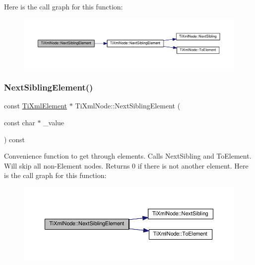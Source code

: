 Here is the call graph for this function\+:
\nopagebreak
\begin{figure}[H]
\begin{center}
\leavevmode
\includegraphics[width=350pt]{class_ti_xml_node_a1b211cb5034655a04358e0e2f6fc5010_cgraph}
\end{center}
\end{figure}
\mbox{\label{class_ti_xml_node_a22def4746238abaee042f99b47ef3c94}} 
\subsubsection{\texorpdfstring{Next\+Sibling\+Element()}{NextSiblingElement()}\hspace{0.1cm}{\footnotesize\ttfamily [3/4]}}
{\footnotesize\ttfamily const \hyperlink{class_ti_xml_element}{Ti\+Xml\+Element} $\ast$ Ti\+Xml\+Node\+::\+Next\+Sibling\+Element (\begin{DoxyParamCaption}\item[{const char $\ast$}]{\+\_\+value }\end{DoxyParamCaption}) const}

Convenience function to get through elements. Calls Next\+Sibling and To\+Element. Will skip all non-\/\+Element nodes. Returns 0 if there is not another element. Here is the call graph for this function\+:
\nopagebreak
\begin{figure}[H]
\begin{center}
\leavevmode
\includegraphics[width=350pt]{class_ti_xml_node_a22def4746238abaee042f99b47ef3c94_cgraph}
\end{center}
\end{figure}
\mbox{\label{class_ti_xml_node_a6e1ac6b800e18049bc75e9f8e63a8e5f}} 
